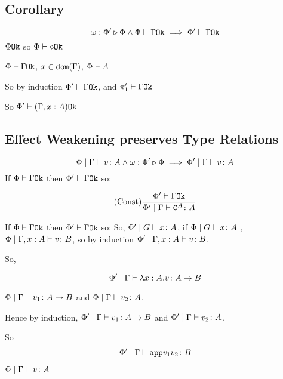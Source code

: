 {    \subsection{Corollary}
    $$\omega : \Phi' \triangleright \Phi\wedge \Phi\vdash \Gamma \texttt{Ok} \implies \Phi'\vdash \Gamma \texttt{Ok}$$
    \bi $\Phi \texttt{Ok}$ so $\Phi\vdash \diamond \texttt{Ok}$

    \bi $\Phi\vdash \Gamma \texttt{Ok}$, $x\in\texttt{dom}(\Gamma)$, $\Phi\vdash A$

    So by induction $\Phi'\vdash \Gamma \texttt{Ok}$, and $\pi_1'\vdash \Gamma \texttt{Ok}$

    So $\Phi'\vdash (\Gamma, x: A) \texttt{Ok}$
    
    \subsection{Effect Weakening preserves Type Relations}

    \begin{equation}
        \Phi\mid\Gamma \vdash v \colon A \wedge \omega : \Phi' \triangleright \Phi \implies \Phi'\mid\Gamma \vdash v \colon A
    \end{equation}
    \proof
    If $\Phi\vdash \Gamma \texttt{Ok}$ then $\Phi'\vdash \Gamma \texttt{Ok}$ so:

    \begin{equation}
        (\text{Const}) \frac{\Phi'\vdash \Gamma \texttt{Ok}}{\Phi'\mid\Gamma \vdash \texttt{C}^{A} \colon A}
    \end{equation}

    If $\Phi\vdash \Gamma \texttt{Ok}$ then $\Phi'\vdash \Gamma \texttt{Ok}$ so:
    So, $\Phi'\mid G \vdash x \colon A$, if $\Phi\mid G \vdash x \colon A$
    \bi, $\Phi\mid\Gamma, x: A \vdash v \colon B$, so by induction $\Phi'\mid\Gamma, x: A \vdash v \colon B$.

    So,

    \begin{equation}
        \Phi'\mid\Gamma \vdash \lambda x : A. v \colon A\rightarrow B
    \end{equation}

    \bi $\Phi\mid\Gamma \vdash v_1 \colon A\rightarrow B$ and $\Phi\mid\Gamma \vdash v_2 \colon A$.

    Hence by induction,
    $\Phi'\mid\Gamma \vdash v_1 \colon A\rightarrow B$ and $\Phi'\mid\Gamma \vdash v_2 \colon A$.

    So $$\Phi'\mid\Gamma \vdash \texttt{app}{v_1}{v_2} \colon B$$


    \bi $\Phi\mid\Gamma \vdash v \colon A$ 
    
}
